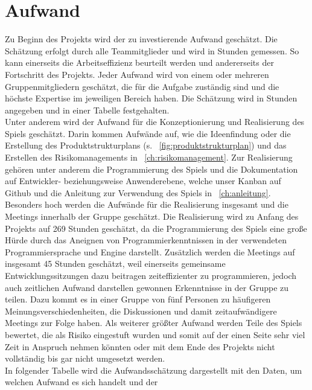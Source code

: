 \chapter{Aufwand}\label{ch:aufwand}
Zu Beginn des Projekts wird der zu investierende Aufwand geschätzt.
Die Schätzung erfolgt durch alle Teammitglieder und wird in Stunden gemessen.
So kann einerseits die Arbeitseffizienz beurteilt werden und andererseits der Fortschritt des Projekts.
Jeder Aufwand wird von einem oder mehreren Gruppenmitgliedern geschätzt, die für die Aufgabe zuständig sind und 
die höchste Expertise im jeweiligen Bereich haben. 
Die Schätzung wird in Stunden angegeben und in einer Tabelle festgehalten.\\
\newline
Unter anderem wird der Aufwand für die Konzeptionierung und Realisierung des Spiels geschätzt.
Darin kommen Aufwände auf, wie die Ideenfindung oder die Erstellung des Produktstrukturplans 
(s. ~\autoref{fig:produktstrukturplan}) und das Erstellen des Risikomanagements in ~\autoref{ch:risikomanagement}.
Zur Realisierung gehören unter anderem die Programmierung des Spiels und die Dokumentation auf Entwickler-
beziehungsweise Anwenderebene, welche unser Kanban auf Github und die Anleitung zur Verwendung des Spiels in ~\autoref{ch:anleitung}.\\
\newline
Besonders hoch werden die Aufwände für die Realisierung insgesamt und die Meetings innerhalb der Gruppe geschätzt.
Die Realisierung wird zu Anfang des Projekts auf 269 Stunden geschätzt, da die Programmierung des Spiels eine große Hürde
durch das Aneignen von Programmierkenntnissen in der verwendeten Programmiersprache und Engine darstellt.
Zusätzlich werden die Meetings auf insgesamt 45 Stunden geschätzt, weil einerseits gemeinsame Entwicklungssitzungen dazu
beitragen zeiteffizienter zu programmieren, jedoch auch zeitlichen Aufwand darstellen gewonnen Erkenntnisse in der
Gruppe zu teilen.
Dazu kommt es in einer Gruppe von fünf Personen zu häufigeren Meinungsverschiedenheiten, die Diskussionen und damit
zeitaufwändigere Meetings zur Folge haben.
Als weiterer größter Aufwand werden Teile des Spiels bewertet, die als Risiko eingestuft wurden und somit auf der einen 
Seite sehr viel Zeit in Anspruch nehmen könnten oder mit dem Ende des Projekts nicht vollständig bis gar nicht umgesetzt
werden. \\
\newline
In folgender Tabelle wird die Aufwandsschätzung dargestellt mit den Daten, um welchen Aufwand es sich handelt und der
